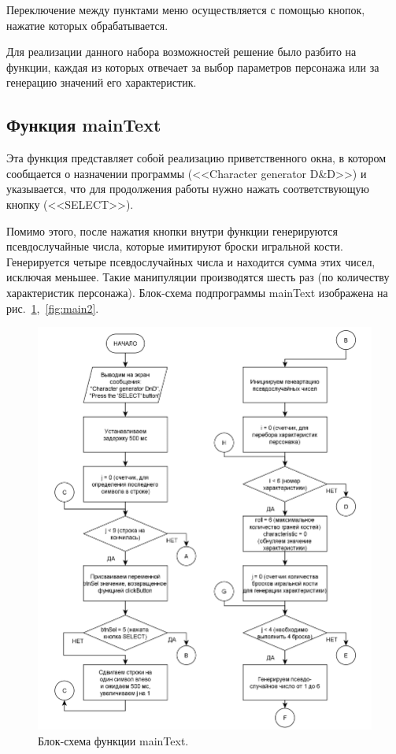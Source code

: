 Переключение между пунктами меню осуществляется с помощью кнопок, нажатие которых обрабатывается.

Для реализации данного набора возможностей решение было разбито на функции, каждая из которых отвечает за выбор параметров персонажа или за генерацию значений его характеристик.

\subsection*{Функция mainText}

Эта функция представляет собой реализацию приветственного окна, в котором сообщается о назначении программы (<<Character generator D\&D>>) и указывается, что для продолжения работы нужно нажать соответствующую кнопку (<<SELECT>>).

Помимо этого, после нажатия кнопки внутри функции генерируются псевдослучайные числа, которые имитируют броски игральной кости. Генерируется четыре псевдослучайных числа и находится сумма этих чисел, исключая меньшее. Такие манипуляции производятся шесть раз (по количеству характеристик персонажа). Блок-схема подпрограммы mainText изображена на рис.~\ref{fig:main1},~\ref{fig:main2}.

\begin{figure}[H]
    \centering
    \includegraphics[scale=0.75]{mainText1.png}
    \caption{Блок-схема функции mainText.}
    \label{fig:main1}
\end{figure}

